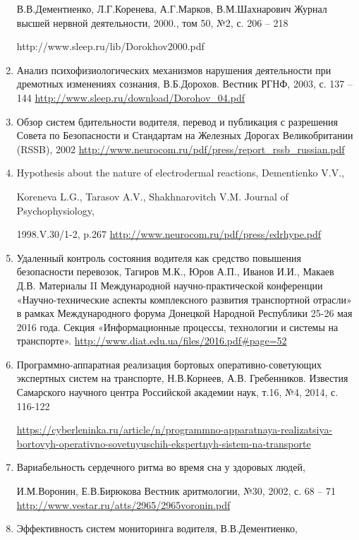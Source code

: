 \begin{enumerate}
    В.В.Дементиенко, Л.Г.Коренева, А.Г.Марков, В.М.Шахнарович
    Журнал высшей нервной деятельности, 2000., том 50, №2, с. 206 – 218
    
    http://www.sleep.ru/lib/Dorokhov2000.pdf 
    \item Анализ психофизиологических механизмов нарушения деятельности при дремотных изменениях сознания, В.Б.Дорохов. Вестник РГНФ, 2003, с. 137 – 144
    \url{http://www.sleep.ru/download/Dorohov_04.pdf}
    \item Обзор систем бдительности водителя, перевод и публикация с разрешения Совета по Безопасности и Стандартам на Железных Дорогах Великобритании (RSSB), 2002
    \url{http://www.neurocom.ru/pdf/press/report_rssb_russian.pdf}
    \item Hypothesis about the nature of electrodermal reactions, Dementienko V.V., 
    
    Koreneva L.G., Tarasov A.V., Shakhnarovitch V.M. Journal of Psychophysiology, 
    
    1998.V.30/1-2, p.267
    \url{http://www.neurocom.ru/pdf/press/edrhype.pdf}
    \item Удаленный контроль состояния водителя как средство повышения безопасности перевозок, Тагиров М.К., Юров А.П., Иванов И.И., Макаев Д.В. Материалы II Международной научно-практической конференции «Научно-\linebreak технические аспекты комплексного развития транспортной отрасли» в рамках Международного форума Донецкой Народной Республики 25-26 мая 2016 года. Секция «Информационные процессы, технологии и системы на транспорте».
    \url{http://www.diat.edu.ua/files/2016.pdf#page=52}
    \item Программно-аппаратная реализация бортовых оперативно-советующих экспертных систем на транспорте, Н.В.Корнеев, А.В. Гребенников. Известия Самарского научного центра Российской академии наук, т.16, №4, 2014, с. 116-122
    
    \url{https://cyberleninka.ru/article/n/programmno-apparatnaya-realizatsi}\linebreak \url{ya-bortovyh-operativno-sovetuyuschih-ekspertnyh-sistem-na-transporte}
    \item Вариабельность сердечного ритма во время сна у здоровых людей, 
    
    И.М.Воронин, Е.В.Бирюкова Вестник аритмологии, №30, 2002, с. 68 – 71
    \url{http://www.vestar.ru/atts/2965/2965voronin.pdf}
    \item Эффективность систем мониторинга водителя, В.В.Дементиенко, 
    

\end{enumerate}
